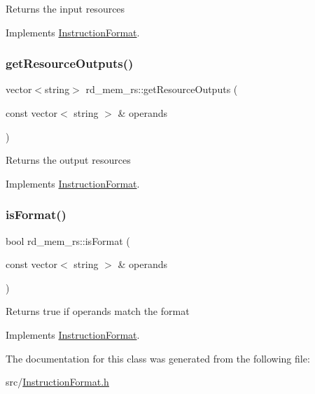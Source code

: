 Returns the input resources 

Implements \hyperlink{classInstructionFormat_a09775d3a3c22f40a0f44504664e586e4}{Instruction\+Format}.

\mbox{\label{classrd__mem__rs_a9f22532c1535bba6776bf7051c50de0f}} 
\subsubsection{\texorpdfstring{get\+Resource\+Outputs()}{getResourceOutputs()}}
{\footnotesize\ttfamily vector$<$string$>$ rd\+\_\+mem\+\_\+rs\+::get\+Resource\+Outputs (\begin{DoxyParamCaption}\item[{const vector$<$ string $>$ \&}]{operands }\end{DoxyParamCaption})\hspace{0.3cm}{\ttfamily [virtual]}}

Returns the output resources 

Implements \hyperlink{classInstructionFormat_a95cd28ffb1bde59b67f676880ab10536}{Instruction\+Format}.

\mbox{\label{classrd__mem__rs_ad9242fac1115765f6cf9f6cf632d8d25}} 
\subsubsection{\texorpdfstring{is\+Format()}{isFormat()}}
{\footnotesize\ttfamily bool rd\+\_\+mem\+\_\+rs\+::is\+Format (\begin{DoxyParamCaption}\item[{const vector$<$ string $>$ \&}]{operands }\end{DoxyParamCaption})\hspace{0.3cm}{\ttfamily [virtual]}}

Returns true if operands match the format 

Implements \hyperlink{classInstructionFormat_a9fdcf94dcd7d9a55ba86e7a63f04d1fe}{Instruction\+Format}.



The documentation for this class was generated from the following file\+:\begin{DoxyCompactItemize}
\item 
src/\hyperlink{InstructionFormat_8h}{Instruction\+Format.\+h}\end{DoxyCompactItemize}
